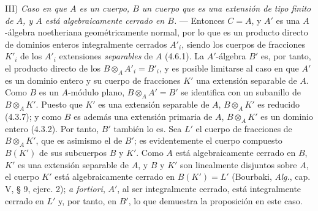 III) \emph{Caso en que $A$ es un cuerpo, $B$ un cuerpo que es una
extensión de tipo finito de $A$, y $A$ está algebraicamente cerrado
en $B$.} --- Entonces $C=A$, y $A'$ es una $A$-álgebra noetheriana
geométricamente normal, por lo que es un producto directo de
dominios enteros integralmente cerrados $A'_i$, siendo los cuerpos de
fracciones $K'_i$ de los $A'_i$ extensiones \emph{separables} de $A$ (4.6.1). La
$A'$-álgebra $B'$ es, por tanto, el producto directo de los
$B\otimes_A A'_i=B'_i$, y es posible limitarse al caso en que $A'$ es
un dominio entero y su cuerpo de fracciones $K'$ una extensión
separable de $A$. Como $B$ es un $A$-módulo plano,
$B\otimes_A A'=B'$ se identifica con un subanillo de
$B\otimes_A K'$. Puesto que $K'$ es una extensión separable de $A$,
$B\otimes_A K'$ es reducido (4.3.7); y como $B$ es además una
extensión primaria de $A$, $B\otimes_A K'$ es un dominio entero
(4.3.2). Por tanto, $B'$ también lo es. Sea $L'$ el cuerpo de
fracciones de $B\otimes_A K'$, que es asimismo el de $B'$; es
evidentemente el cuerpo compuesto $B(K')$ de sus subcuerpos $B$ y
$K'$. Como $A$ está algebraicamente cerrado en $B$, $K'$ es una
extensión separable de $A$, y $B$ y $K'$ son linealmente disjuntos
sobre $A$, el cuerpo $K'$ está algebraicamente cerrado en
$B(K')=L'$ (Bourbaki, \emph{Alg.}, cap. V, § 9, ejerc. 2); \emph{a fortiori}, $A'$, al ser integralmente cerrado, está integralmente
cerrado en $L'$ y, por tanto, en $B'$, lo que demuestra la
proposición en este caso.

